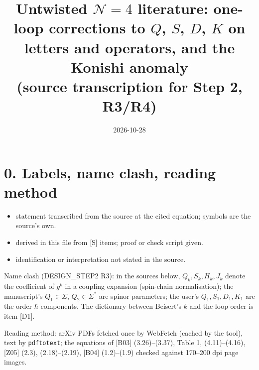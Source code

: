 \documentclass[10pt]{article}
\title{Untwisted $\mathcal N=4$ literature: one-loop corrections to $Q$, $S$, $D$, $K$ on letters and operators, and the Konishi anomaly\\ (source transcription for Step 2, R3/R4)}
\date{2026-10-28}
\begin{document}
\maketitle

\section*{0. Labels, name clash, reading method}
\begin{itemize}
\item[{[S]}] statement transcribed from the source at the cited equation; symbols are the source's own.
\item[{[D]}] derived in this file from [S] items; proof or check script given.
\item[{[I]}] identification or interpretation not stated in the source.
\end{itemize}
Name clash (DESIGN\_STEP2 R3): in the sources below, $Q_k,S_k,H_k,J_k$ denote the coefficient of $g^k$ in a coupling expansion (spin-chain normalisation); the manuscript's $Q_1\in\Sigma$, $Q_2\in\Sigma^*$ are spinor parameters; the user's $Q_1,S_1,D_1,K_1$ are the order-$\hbar$ components. The dictionary between Beisert's $k$ and the loop order is item [D1].

Reading method: arXiv PDFs fetched once by WebFetch (cached by the tool), text by \texttt{pdftotext}; the equations of [B03] (3.26)--(3.37), Table 1, (4.11)--(4.16), [Z05] (2.3), (2.18)--(2.19), [B04] (1.2)--(1.9) checked against 170--200 dpi page images.
\end{document}

